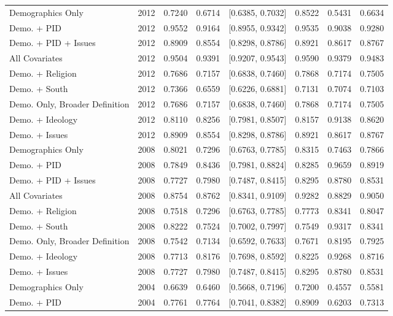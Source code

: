 \begin{longtable}{lrrrlrrr}
  Demographics Only & 2012 & 0.7240 & 0.6714 & [0.6385, 0.7032] & 0.8522 & 0.5431 & 0.6634 \\ 
  Demo. + PID & 2012 & 0.9552 & 0.9164 & [0.8955, 0.9342] & 0.9535 & 0.9038 & 0.9280 \\ 
  Demo. + PID + Issues & 2012 & 0.8909 & 0.8554 & [0.8298, 0.8786] & 0.8921 & 0.8617 & 0.8767 \\ 
  All Covariates & 2012 & 0.9504 & 0.9391 & [0.9207, 0.9543] & 0.9590 & 0.9379 & 0.9483 \\ 
  Demo. + Religion & 2012 & 0.7686 & 0.7157 & [0.6838, 0.7460] & 0.7868 & 0.7174 & 0.7505 \\ 
  Demo. + South & 2012 & 0.7366 & 0.6559 & [0.6226, 0.6881] & 0.7131 & 0.7074 & 0.7103 \\ 
  Demo. Only, Broader Definition & 2012 & 0.7686 & 0.7157 & [0.6838, 0.7460] & 0.7868 & 0.7174 & 0.7505 \\ 
  Demo. + Ideology & 2012 & 0.8110 & 0.8256 & [0.7981, 0.8507] & 0.8157 & 0.9138 & 0.8620 \\ 
  Demo. + Issues & 2012 & 0.8909 & 0.8554 & [0.8298, 0.8786] & 0.8921 & 0.8617 & 0.8767 \\ 
  Demographics Only & 2008 & 0.8021 & 0.7296 & [0.6763, 0.7785] & 0.8315 & 0.7463 & 0.7866 \\ 
  Demo. + PID & 2008 & 0.7849 & 0.8436 & [0.7981, 0.8824] & 0.8285 & 0.9659 & 0.8919 \\ 
  Demo. + PID + Issues & 2008 & 0.7727 & 0.7980 & [0.7487, 0.8415] & 0.8295 & 0.8780 & 0.8531 \\ 
  All Covariates & 2008 & 0.8754 & 0.8762 & [0.8341, 0.9109] & 0.9282 & 0.8829 & 0.9050 \\ 
  Demo. + Religion & 2008 & 0.7518 & 0.7296 & [0.6763, 0.7785] & 0.7773 & 0.8341 & 0.8047 \\ 
  Demo. + South & 2008 & 0.8222 & 0.7524 & [0.7002, 0.7997] & 0.7549 & 0.9317 & 0.8341 \\ 
  Demo. Only, Broader Definition & 2008 & 0.7542 & 0.7134 & [0.6592, 0.7633] & 0.7671 & 0.8195 & 0.7925 \\ 
  Demo. + Ideology & 2008 & 0.7713 & 0.8176 & [0.7698, 0.8592] & 0.8225 & 0.9268 & 0.8716 \\ 
  Demo. + Issues & 2008 & 0.7727 & 0.7980 & [0.7487, 0.8415] & 0.8295 & 0.8780 & 0.8531 \\ 
  Demographics Only & 2004 & 0.6639 & 0.6460 & [0.5668, 0.7196] & 0.7200 & 0.4557 & 0.5581 \\ 
  Demo. + PID & 2004 & 0.7761 & 0.7764 & [0.7041, 0.8382] & 0.8909 & 0.6203 & 0.7313 \\ 

\end{longtable}
